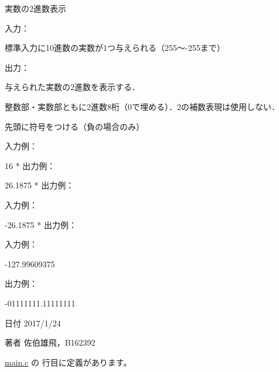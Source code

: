 実数の2進数表示 

入力：
\begin{DoxyItemize}
\item 標準入力に10進数の実数が1つ与えられる（255〜-\/255まで）
\end{DoxyItemize}

出力：
\begin{DoxyItemize}
\item 与えられた実数の2進数を表示する．
\item 整数部・実数部ともに2進数8桁（0で埋める）．2の補数表現は使用しない．
\item 先頭に符号をつける（負の場合のみ）
\end{DoxyItemize}

入力例： \begin{DoxyVerb}16
  *  出力例：
\end{DoxyVerb}
 \begin{DoxyVerb}26.1875
  *  出力例：
\end{DoxyVerb}
 入力例： \begin{DoxyVerb}-26.1875
  *  出力例：
\end{DoxyVerb}
 入力例： \begin{DoxyVerb}-127.99609375
\end{DoxyVerb}
 出力例： \begin{DoxyVerb}-01111111.11111111
\end{DoxyVerb}
 \begin{DoxyDate}{日付}
2017/1/24 
\end{DoxyDate}
\begin{DoxyAuthor}{著者}
佐伯雄飛，\-B162392 
\end{DoxyAuthor}


 \hyperlink{main_8c_source}{main.\-c} の  行目に定義があります。


